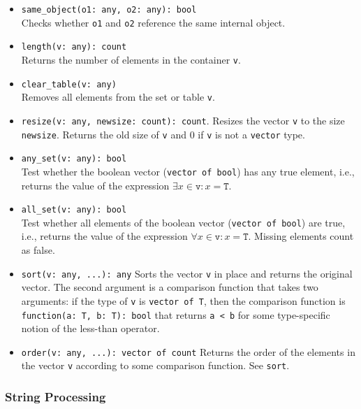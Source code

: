 \documentclass[10pt,landscape]{article}
\begin{document}
\begin{multicols*}{2}
\begin{itemize}
  \item \verb|same_object(o1: any, o2: any): bool|\\
    Checks whether \texttt{o1} and \texttt{o2} reference the same internal
    object.
  \item \verb|length(v: any): count|\\
    Returns the number of elements in the container \texttt{v}.
  \item \verb|clear_table(v: any)|\\
    Removes all elements from the set or table \texttt{v}.
  \item \verb|resize(v: any, newsize: count): count|.
    Resizes the vector \verb|v| to the size \verb|newsize|.
    Returns the old size of \verb|v| and 0 if \verb|v| is not a \verb|vector|
    type.
  \item \verb|any_set(v: any): bool|\\
    Test whether the boolean vector (\verb|vector of bool|) has any true
    element, i.e., returns the value of the expression
    $\exists x \in \mathtt{v}: x = \mathtt{T}$.
  \item \verb|all_set(v: any): bool|\\
    Test whether all elements of the boolean vector (\verb|vector of bool|) are
    true, i.e., returns the value of the expression
    $\forall x \in \mathtt{v}: x = \mathtt{T}$. Missing elements count as
    false.
  \item \verb|sort(v: any, ...): any|
    Sorts the vector \verb|v| in place and returns the original vector. 
    The second argument is a comparison function that takes two arguments: if
    the type of \verb|v| is \verb|vector of T|, then the comparison function is
    \verb|function(a: T, b: T): bool| that returns \verb|a < b| for some
    type-specific notion of the less-than operator.
  \item \verb|order(v: any, ...): vector of count|
    Returns the order of the elements in the vector \verb|v| according to some
    comparison function. See \verb|sort|.
\end{itemize}

\subsubsection*{String Processing}


\end{multicols*}
\end{document}
